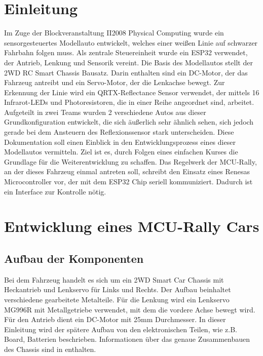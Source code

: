 \section{Einleitung}

Im Zuge der Blockveranstaltung II2008 Physical Computing wurde ein sensorgesteuertes Modellauto entwickelt, welches einer weißen Linie auf schwarzer Fahrbahn folgen muss. Als zentrale Steuereinheit wurde ein ESP32 verwendet, der Antrieb, Lenkung und Sensorik vereint. Die Basis des Modellautos stellt der 2WD RC Smart Chassis Bausatz. Darin enthalten sind ein DC-Motor, der das Fahrzeug antreibt und ein Servo-Motor, der die Lenkachse bewegt. Zur Erkennung der Linie wird ein QRTX-Reflectance Sensor verwendet, der mittels 16 Infrarot-LEDs und Photoresistoren, die in einer Reihe angeordnet sind, arbeitet. Aufgeteilt in zwei Teams wurden 2 verschiedene Autos aus dieser Grundkonfiguration entwickelt, die sich äußerlich sehr ähnlich sehen, sich jedoch gerade bei dem Ansteuern des Reflexionssensor stark unterscheiden. Diese Dokumentation soll einen Einblick in den Entwicklungsprozess eines dieser Modellautos vermitteln. Ziel ist es, durch Folgen eines einfachen Kurses die Grundlage für die Weiterentwicklung zu schaffen. Das Regelwerk der MCU-Rally, an der dieses Fahrzeug einmal antreten soll, schreibt den Einsatz eines Renesas Microcontroller vor, der mit dem ESP32 Chip seriell kommuniziert. Dadurch ist ein Interface zur Kontrolle nötig.

\section{Entwicklung eines MCU-Rally Cars}

	\subsection{Aufbau der Komponenten}
    
    	Bei dem Fahrzeug handelt es sich um ein 2WD Smart Car Chassis mit Heckantrieb und Lenkservo für Links und Rechts.
        Der Aufbau beinhaltet verschiedene gearbeitete Metalteile. Für die Lenkung wird ein Lenkservo MG996R mit Metallgetriebe verwendet, mit dem die vordere Achse bewegt wird. Für den Antrieb dient ein DC-Motor mit 25mm Durchmesser.
        In dieser Einleitung wird der spätere Aufbau von den elektronischen Teilen, wie z.B. Board, Batterien beschrieben. Informationen über das genaue Zusammenbauen des Chassis sind in \cite{roboter-bausatz.de2WDRCSMART2020} enthalten.\\
        
